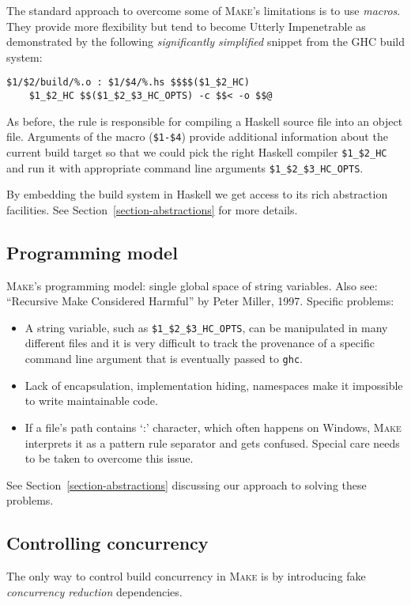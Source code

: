 The standard approach to overcome some of \textsc{Make}'s limitations is to use
\emph{macros}. They provide more flexibility but tend to become Utterly
Impenetrable as demonstrated by the following \emph{significantly simplified}
snippet from the GHC build system:

\begin{verbatim}
$1/$2/build/%.o : $1/$4/%.hs $$$$($1_$2_HC)
    $1_$2_HC $$($1_$2_$3_HC_OPTS) -c $$< -o $$@
\end{verbatim}

\noindent As before, the rule is responsible for compiling a Haskell source
file into an object file. Arguments of the macro (\texttt{\$1-\$4}) provide
additional information about the current build target so that we could pick the
right Haskell compiler \texttt{\$1\_\$2\_HC} and run it with appropriate command
line arguments \texttt{\$1\_\$2\_\$3\_HC\_OPTS}.

By embedding the build system in Haskell we get access to its rich abstraction
facilities. See Section~\ref{section-abstractions} for more details.

\subsection{Programming model}

\textsc{Make}'s programming model: single global space of string variables. Also
see: ``Recursive Make Considered Harmful'' by Peter Miller, 1997. Specific problems:
\begin{itemize}
  \item A string variable, such as \texttt{\$1\_\$2\_\$3\_HC\_OPTS}, can be
  manipulated in many different files and it is very difficult to track the
  provenance of a specific command line argument that is eventually passed to
  \texttt{ghc}.
  \item Lack of encapsulation, implementation hiding, namespaces make it
  impossible to write maintainable code.
  \item If a file's path contains `:' character, which often happens on Windows,
  \textsc{Make} interprets it as a pattern rule separator and gets confused.
  Special care needs to be taken to overcome this issue.
\end{itemize}

See Section~\ref{section-abstractions} discussing our approach to solving
these problems.

\subsection{Controlling concurrency}
The only way to control build concurrency in \textsc{Make} is by introducing
fake \emph{concurrency reduction} dependencies. 

